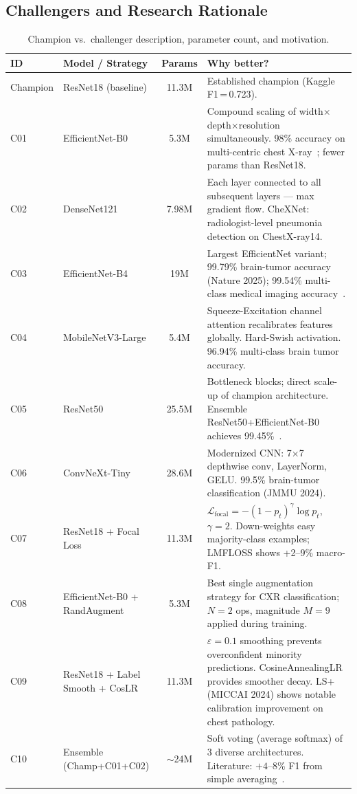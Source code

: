 \documentclass[11pt, letterpaper]{article}
\begin{document}
\subsection{Challengers and Research Rationale}

\begin{table}[H]
  \centering\small
  \caption{Champion vs.\ challenger description, parameter count, and motivation.}
  \begin{tabular}{llcp{6.5cm}}
    \toprule
    \textbf{ID} & \textbf{Model / Strategy} & \textbf{Params} & \textbf{Why better?} \\
    \midrule
    Champion & ResNet18 (baseline) & 11.3M & Established champion (Kaggle F1\,=\,0.723). \\
    \midrule
    C01 & EfficientNet-B0~\cite{effnet} & 5.3M &
      Compound scaling of width$\times$depth$\times$resolution simultaneously.
      98\% accuracy on multi-centric chest X-ray~\cite{effcxr}; fewer params than ResNet18. \\
    C02 & DenseNet121~\cite{densenet,chexnet} & 7.98M &
      Each layer connected to all subsequent layers --- max gradient flow.
      CheXNet: radiologist-level pneumonia detection on ChestX-ray14. \\
    C03 & EfficientNet-B4~\cite{effnet} & 19M &
      Largest EfficientNet variant; 99.79\% brain-tumor accuracy (Nature 2025);
      99.54\% multi-class medical imaging accuracy~\cite{effb4}. \\
    C04 & MobileNetV3-Large~\cite{mobilev3} & 5.4M &
      Squeeze-Excitation channel attention recalibrates features globally.
      Hard-Swish activation. 96.94\% multi-class brain tumor accuracy. \\
    C05 & ResNet50~\cite{resnet} & 25.5M &
      Bottleneck blocks; direct scale-up of champion architecture.
      Ensemble ResNet50+EfficientNet-B0 achieves 99.45\%~\cite{ensemble25}. \\
    C06 & ConvNeXt-Tiny~\cite{convnext} & 28.6M &
      Modernized CNN: 7$\times$7 depthwise conv, LayerNorm, GELU.
      99.5\% brain-tumor classification (JMMU 2024). \\
    C07 & ResNet18 + Focal Loss~\cite{focalloss} & 11.3M &
      $\mathcal{L}_\text{focal}=-(1{-}p_t)^\gamma\!\log p_t$, $\gamma{=}2$.
      Down-weights easy majority-class examples; LMFLOSS shows +2--9\% macro-F1. \\
    C08 & EfficientNet-B0 + RandAugment~\cite{randaug} & 5.3M &
      Best single augmentation strategy for CXR classification;
      $N{=}2$ ops, magnitude $M{=}9$ applied during training. \\
    C09 & ResNet18 + Label Smooth + CosLR & 11.3M &
      $\varepsilon{=}0.1$ smoothing prevents overconfident minority predictions.
      CosineAnnealingLR provides smoother decay. LS+ (MICCAI 2024)
      shows notable calibration improvement on chest pathology. \\
    C10 & Ensemble (Champ+C01+C02) & $\sim$24M &
      Soft voting (average softmax) of 3 diverse architectures.
      Literature: $+4$--8\% F1 from simple averaging~\cite{ensemble25}. \\
    \bottomrule
  \end{tabular}
\end{table}
\end{document}
